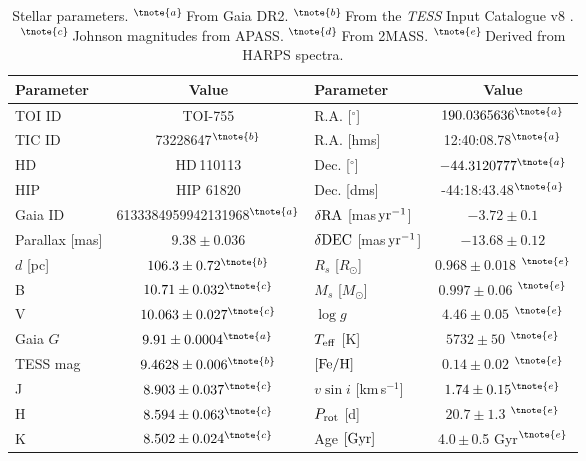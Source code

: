 \documentclass[fleqn,usenatbib]{mnras}
\newcommand{\tess}{{\it TESS}}
\newcommand{\harps}{{HARPS}}
\newcommand{\kms}{km\,s$^{-1}$}
\newcommand{\msun}{\mbox{$M_{\odot}$}}
\newcommand{\rsun}{\mbox{$R_{\odot}$}}
\newcommand{\vsini}{$v\sin{i}$}
\newcommand{\teff}{$T_{\rm eff}$}
\newcommand{\feh}{\mbox{$\rm [Fe/H]$}}
\newcommand{\logg}{$\log g$}
\newcommand{\Tlogg}{ $ 4.46 \pm 0.05 $ }
\newcommand{\TFeH}{ $ 0.14 \pm 0.02 $ }
\newcommand{\TTeff}{ $ 5732 \pm 50 $ }
\newcommand{\Tmstar}{ $ 0.997 \pm 0.06 $ }
\newcommand{\Trstar}{ $ 0.968 \pm 0.018 $ }
\newcommand{\Tperiod}{ $ 20.7 \pm 1.3 $ }
\newcommand{\TTstar}{TOI-755}
\newcommand{\Tstar}{HD\,110113}
\newcommand{\Tstarage}{4.0\,$\pm$\,0.5 Gyr}
\newcommand{\TGAIAid}{6133384959942131968}
\begin{document}
\begin{table}
    \centering
    \begin{tabular}{lc|lc}
        \hline
        \hline
        Parameter & Value & Parameter & Value \\
        \hline
        \hline
        TOI ID & \TTstar & R.A. [$^{\circ}$] & $190.0365636^{\tnote{a}}$ \\
        TIC ID & 73228647$^{\tnote{b}}$ & R.A. [hms] & 12:40:08.78$^{\tnote{a}}$ \\
        HD & \Tstar & Dec. [$^{\circ}$] & $-44.3120777^{\tnote{a}}$\\
        HIP & HIP 61820 & Dec. [dms] & -44:18:43.48$^{\tnote{a}}$ \\
        Gaia ID & {\scriptsize \TGAIAid}$^{\tnote{a}}$ & $\delta{\rm RA}$ [mas\,${\rm yr}^{-1}$] & $-3.72 \pm 0.1$ \\
        Parallax [mas] & $9.38 \pm 0.036 $ & $\delta{\rm DEC}$ [mas\,${\rm yr}^{-1}$] & $-13.68 \pm 0.12 $ \\
        $d$ [pc] & $ 106.3\pm0.72^{\tnote{b}}$ & $R_s$ [\rsun{}] & \Trstar{}$^{\tnote{e}}$ \\
        B & $10.71\pm0.032^{\tnote{c}}$ & $M_s$ [\msun{}] & \Tmstar{}$^{\tnote{e}}$ \\
        V & $10.063\pm0.027^{\tnote{c}}$ &  \logg{} & \Tlogg{}$^{\tnote{e}}$ \\
        Gaia $G$ & $9.91\pm0.0004 ^{\tnote{a}}$ & \teff{} [K] & \TTeff{}$^{\tnote{e}}$ \\
        TESS mag & $9.4628\pm0.006^{\tnote{b}}$ & \feh{} & \TFeH{}$^{\tnote{e}}$ \\
        J & $8.903 \pm 0.037^{\tnote{c}}$ & \vsini{} [\kms{}]& $1.74\pm0.15^{\tnote{e}}$\\
        H & $8.594 \pm 0.063^{\tnote{c}}$ & $P_{\rm rot}$ [d] & \Tperiod{}$^{\tnote{e}}$\\
        K & $8.502 \pm0.024^{\tnote{c}}$ & Age $[{\rm Gyr}]$ & \Tstarage{}$^{\tnote{e}}$ \\
        \hline
        \hline
    \end{tabular}
    \caption{Stellar parameters.
    $^{\tnote{a}}$\,From Gaia DR2\citep{brown2018gaia}. $^{\tnote{b}}$\,From the \tess{} Input Catalogue v8 \citep{stassun2019revised}. $^{\tnote{c}}$\,Johnson magnitudes from APASS\citep{apass}. $^{\tnote{d}}$\,From 2MASS\citep{skrutskie2006two}. $^{\tnote{e}}$\,Derived from \harps{} spectra.}
    \label{tab:starpars}
\end{table}
\end{document}
